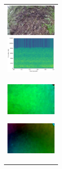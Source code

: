 \begin{figure}[htbp]
\begin{tabular}{l}
\begin{minipage}{0.165\hsize}
      \end{minipage}
      \begin{minipage}{0.165\hsize}
        \begin{center}
          \includegraphics[clip, width=2.5cm]{./Figures/still_stop1-5.eps}
        \end{center}
      \end{minipage}
      \begin{minipage}{0.165\hsize}
        \begin{center}
          \includegraphics[clip, width=2.5cm]{./Figures/sound_stop.eps}
        \end{center}
      \end{minipage}
\\  %
      \begin{minipage}{0.165\hsize}
        \begin{center}
          \includegraphics[clip, width=2.5cm]{./Figures/optic_stop1-1.eps}
          \hspace{0.3cm} { }
        \end{center}
      \end{minipage}
      \begin{minipage}{0.165\hsize}
        \begin{center}
          \includegraphics[clip, width=2.5cm]{./Figures/optic_stop1-2.eps}
          \hspace{0.0cm} { }
        \end{center}
      \end{minipage}
      \begin{minipage}{0.165\hsize}
        \begin{center}

\end{center}
\end{minipage}
\end{tabular}
\end{figure}

